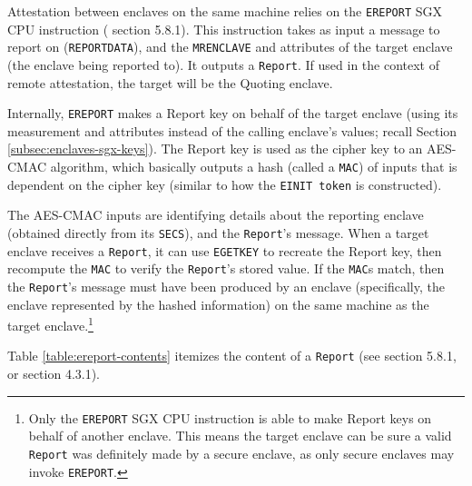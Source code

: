 Attestation between enclaves on the same machine relies on the {\tt EREPORT} SGX CPU instruction (\cite{intel-sgx-explained-advanced} section 5.8.1). This instruction takes as input a message to report on ({\tt REPORTDATA}), and the {\tt MRENCLAVE} and attributes of the target enclave (the enclave being reported to). It outputs a {\tt Report}. If used in the context of remote attestation, the target will be the Quoting enclave.

Internally, {\tt EREPORT} makes a Report key on behalf of the target enclave (using its measurement and attributes instead of the calling enclave's values; recall Section \ref{subsec:enclaves-sgx-keys}). The Report key is used as the cipher key to an AES-CMAC algorithm, which basically outputs a hash (called a {\tt MAC}) of inputs that is dependent on the cipher key (similar to how the {\tt EINIT token} is constructed).

The AES-CMAC inputs are identifying details about the reporting enclave (obtained directly from its {\tt SECS}), and the {\tt Report}'s message. When a target enclave receives a {\tt Report}, it can use {\tt EGETKEY} to recreate the Report key, then recompute the {\tt MAC} to verify the {\tt Report}'s stored value. If the {\tt MAC}s match, then the {\tt Report}'s message must have been produced by an enclave (specifically, the enclave represented by the hashed information) on the same machine as the target enclave.\footnote{Only the {\tt EREPORT} SGX CPU instruction is able to make Report keys on behalf of another enclave. This means the target enclave can be sure a valid {\tt Report} was definitely made by a secure enclave, as only secure enclaves may invoke {\tt EREPORT}.}

Table \ref{table:ereport-contents} itemizes the content of a {\tt Report} (see \cite{intel-sgx-explained-advanced} section 5.8.1, or \cite{sgx-attestation-service-api} section 4.3.1).

